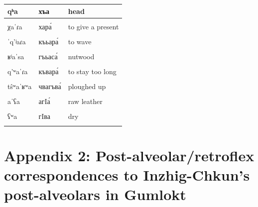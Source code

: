 \documentclass[
]{article}
\begin{document}
\begin{longtable}{l|l|l}
\hline
qʰa & хъа & head\\
\hline
\cellcolor{gray!6}{q’aˈla} & \cellcolor{gray!6}{къала́} & \cellcolor{gray!6}{town}\\
\hline
χaˈɾa & хара́ & to give a present\\
\hline
\cellcolor{gray!6}{ˈʁaʁa} & \cellcolor{gray!6}{гъа́гъа} & \cellcolor{gray!6}{broad, wide}\\
\hline
ˈq’ʲaɾa & къьара́ & to wave\\
\hline
\cellcolor{gray!6}{χʲaˈɾa} & \cellcolor{gray!6}{хьара́} & \cellcolor{gray!6}{to give birth}\\
\hline
ʁʲaˈsa & гъьаса́ & nutwood\\
\hline
\cellcolor{gray!6}{qʰʷa} & \cellcolor{gray!6}{хъва} & \cellcolor{gray!6}{ashes}\\
\hline
q’ʷaˈɾa & къвара́ & to stay too long\\
\hline
\cellcolor{gray!6}{χʷa} & \cellcolor{gray!6}{хва} & \cellcolor{gray!6}{mountain}\\
\hline
tŝʷaˈʁʷa & чвагъва́ & ploughed up\\
\hline
\cellcolor{gray!6}{ħa} & \cellcolor{gray!6}{хIа} & \cellcolor{gray!6}{we}\\
\hline
aˈʕa & агIа́ & raw leather\\
\hline
\cellcolor{gray!6}{ħʷa} & \cellcolor{gray!6}{хIва} & \cellcolor{gray!6}{pig}\\
\hline
ʕʷa & гIва & dry\\
\hline
\cellcolor{gray!6}{aˈʔaɕa} & \cellcolor{gray!6}{аъа́ща} & \cellcolor{gray!6}{situation}\\
\hline
\end{longtable}

\pagebreak

\hypertarget{appendix-2-post-alveolarretroflex-correspondences-to-inzhig-chkuns-post-alveolars-in-gumlokt}{%
\section*{Appendix 2: Post-alveolar/retroflex correspondences to
Inzhig-Chkun's post-alveolars in
Gumlokt}\label{appendix-2-post-alveolarretroflex-correspondences-to-inzhig-chkuns-post-alveolars-in-gumlokt}}
\end{document}
